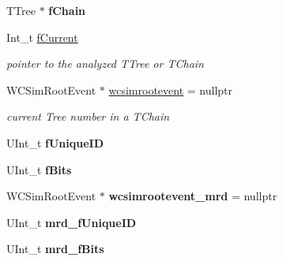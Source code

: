 \begin{DoxyCompactItemize}
\item 
\hypertarget{classwcsimT_a5c98538e1fd01d831ed2c26ccb24ec4e}{
TTree $\ast$ {\bfseries fChain}}
\label{classwcsimT_a5c98538e1fd01d831ed2c26ccb24ec4e}

\item 
\hypertarget{classwcsimT_afdb949d4952d83d8d99a7e4540b6b6e1}{
Int\_\-t \hyperlink{classwcsimT_afdb949d4952d83d8d99a7e4540b6b6e1}{fCurrent}}
\label{classwcsimT_afdb949d4952d83d8d99a7e4540b6b6e1}

\begin{DoxyCompactList}\small\item\em pointer to the analyzed TTree or TChain \item\end{DoxyCompactList}\item 
\hypertarget{classwcsimT_a9c27e0faaac735ca39c6a86dfd026178}{
WCSimRootEvent $\ast$ \hyperlink{classwcsimT_a9c27e0faaac735ca39c6a86dfd026178}{wcsimrootevent} = nullptr}
\label{classwcsimT_a9c27e0faaac735ca39c6a86dfd026178}

\begin{DoxyCompactList}\small\item\em current Tree number in a TChain \item\end{DoxyCompactList}\item 
\hypertarget{classwcsimT_afc0d2d8a92351a9f3a4747b8abcde647}{
UInt\_\-t {\bfseries fUniqueID}}
\label{classwcsimT_afc0d2d8a92351a9f3a4747b8abcde647}

\item 
\hypertarget{classwcsimT_a9209d40fc60edd183e5d13246ce3c5ab}{
UInt\_\-t {\bfseries fBits}}
\label{classwcsimT_a9209d40fc60edd183e5d13246ce3c5ab}

\item 
\hypertarget{classwcsimT_a97ea4ca240a2d0fc780353712d99938b}{
WCSimRootEvent $\ast$ {\bfseries wcsimrootevent\_\-mrd} = nullptr}
\label{classwcsimT_a97ea4ca240a2d0fc780353712d99938b}

\item 
\hypertarget{classwcsimT_a5b73ff1e61e0e849285c22c6e0c366e4}{
UInt\_\-t {\bfseries mrd\_\-fUniqueID}}
\label{classwcsimT_a5b73ff1e61e0e849285c22c6e0c366e4}

\item 
\hypertarget{classwcsimT_a3214c3f17cb228fd289f5f2879ad8c32}{
UInt\_\-t {\bfseries mrd\_\-fBits}}
\label{classwcsimT_a3214c3f17cb228fd289f5f2879ad8c32}


\end{DoxyCompactItemize}
